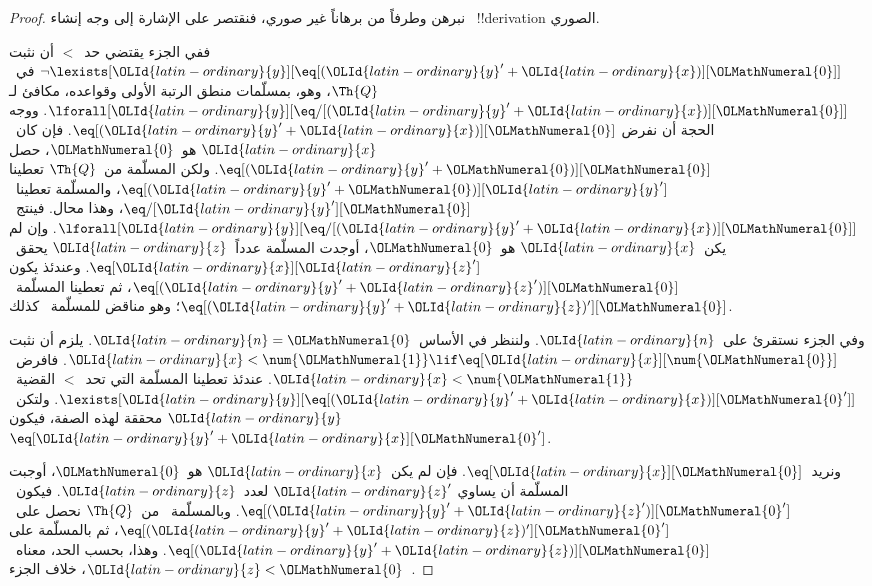 \documentclass[../../../include/open-logic-section]{subfiles}
\begin{document}
\begin{proof}
نبرهن  وطرفاً من  برهاناً غير صوري، فنقتصر على الإشارة إلى وجه إنشاء
~!!{derivation} الصوري.

ففي الجزء  يقتضي حد~$<$ أن نثبت
$\lnot \lexists[{\OLId{latin-ordinary}{y}}][\eq[({\OLId{latin-ordinary}{y}}'+{\OLId{latin-ordinary}{x}})][{\OLMathNumeral{0}}]]$ في~$\Th{Q}$، وهو، بمسلّمات منطق
الرتبة الأولى وقواعده، مكافئ لـ
$\lforall[{\OLId{latin-ordinary}{y}}][\eq/[({\OLId{latin-ordinary}{y}}' + {\OLId{latin-ordinary}{x}})][{\OLMathNumeral{0}}]]$. ووجه الحجة أن نفرض
$\eq[({\OLId{latin-ordinary}{y}}'+{\OLId{latin-ordinary}{x}})][{\OLMathNumeral{0}}]$. فإن كان~${\OLId{latin-ordinary}{x}}$ هو~${\OLMathNumeral{0}}$، حصل
$\eq[({\OLId{latin-ordinary}{y}}' + {\OLMathNumeral{0}})][{\OLMathNumeral{0}}]$. ولكن المسلّمة  من~$\Th{Q}$ تعطينا
$\eq[({\OLId{latin-ordinary}{y}}' + {\OLMathNumeral{0}})][{\OLId{latin-ordinary}{y}}']$، والمسلّمة  تعطينا~$\eq/[{\OLId{latin-ordinary}{y}}'][{\OLMathNumeral{0}}]$، وهذا محال.
فينتج~$\lforall[{\OLId{latin-ordinary}{y}}][\eq/[({\OLId{latin-ordinary}{y}}' +{\OLId{latin-ordinary}{x}})][{\OLMathNumeral{0}}]]$. وإن لم يكن~${\OLId{latin-ordinary}{x}}$ هو~${\OLMathNumeral{0}}$، أوجدت
المسلّمة  عدداً~${\OLId{latin-ordinary}{z}}$ يحقق~$\eq[{\OLId{latin-ordinary}{x}}][{\OLId{latin-ordinary}{z}}']$. وعندئذ يكون
$\eq[({\OLId{latin-ordinary}{y}}' + {\OLId{latin-ordinary}{z}}')][{\OLMathNumeral{0}}]$، ثم تعطينا المسلّمة~
$\eq[({\OLId{latin-ordinary}{y}}' + {\OLId{latin-ordinary}{z}})'][{\OLMathNumeral{0}}]$؛ وهو مناقض للمسلّمة~ كذلك.

وفي الجزء  نستقرئ على~${\OLId{latin-ordinary}{n}}$. ولننظر في الأساس~${\OLId{latin-ordinary}{n}} ={\OLMathNumeral{0}}$. يلزم أن نثبت
${\OLId{latin-ordinary}{x}} < \num {\OLMathNumeral{1}} \lif \eq[{\OLId{latin-ordinary}{x}}][\num {\OLMathNumeral{0}}]$. فافرض~${\OLId{latin-ordinary}{x}} < \num {\OLMathNumeral{1}}$. عندئذ تعطينا
المسلّمة التي تحد~$<$ القضية~$\lexists[{\OLId{latin-ordinary}{y}}][\eq[({\OLId{latin-ordinary}{y}}'+{\OLId{latin-ordinary}{x}})][{\OLMathNumeral{0}}']]$. ولتكن~${\OLId{latin-ordinary}{y}}$
محققة لهذه الصفة، فيكون~$\eq[{\OLId{latin-ordinary}{y}}'+{\OLId{latin-ordinary}{x}}][{\OLMathNumeral{0}}']$.

ونريد~$\eq[{\OLId{latin-ordinary}{x}}][{\OLMathNumeral{0}}]$. فإن لم يكن~${\OLId{latin-ordinary}{x}}$ هو~${\OLMathNumeral{0}}$، أوجبت المسلّمة  أن يساوي
${\OLId{latin-ordinary}{z}}'$ لعدد~${\OLId{latin-ordinary}{z}}$. فيكون~$\eq[({\OLId{latin-ordinary}{y}}' + {\OLId{latin-ordinary}{z}}')][{\OLMathNumeral{0}}']$. وبالمسلّمة~ من~$\Th{Q}$
نحصل على~$\eq[({\OLId{latin-ordinary}{y}}'+{\OLId{latin-ordinary}{z}})'][{\OLMathNumeral{0}}']$، ثم بالمسلّمة  على
$\eq[({\OLId{latin-ordinary}{y}}' + {\OLId{latin-ordinary}{z}})][{\OLMathNumeral{0}}]$. وهذا، بحسب الحد، معناه~${\OLId{latin-ordinary}{z}} < {\OLMathNumeral{0}}$، خلاف الجزء~.
\end{proof}
\end{document}
